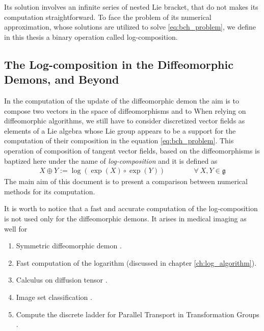 Its solution involves an infinite series of nested Lie bracket, that do not makes its computation straightforward. 
To face the problem of its numerical approximation, whose solutions are utilized to solve \ref{eq:bch_problem}, we define in this thesis a binary operation called log-composition.


\subsection{The Log-composition in the Diffeomorphic Demons, and Beyond}
In the computation of the update of the diffeomorphic demon the aim is to compose two vectors in the space of diffeomorphisms and to 
When relying on diffeomorphic algorithms, we still have to consider discretized vector fields as elements of a Lie algebra whose Lie group appears to be a support for the computation of their composition in the equation \ref{eq:bch_problem}.
This operation of composition of tangent vector fields, based on the diffeomorphisms is baptized here under the name of \emph{log-composition} and it is defined as
\begin{align*}
X \oplus Y := \log(\exp(X)\circ\exp( Y))
\qquad \qquad
\forall ~X, Y \in \mathfrak{g}
\end{align*}
The main aim of this document is to present a comparison between numerical methods for its computation. 

It is worth to notice that a fast and accurate computation of the log-composition is not used only for the diffeomorphic demons. It arises in medical imaging as well for
\begin{enumerate}
	\item Symmetric diffeomorphic demon \cite{vercauteren08}.
	\item Fast computation of the logarithm \cite{Bossa:08} (discussed in chapter \ref{ch:log_algorithm}).
	\item Calculus on diffusion tensor \cite{Arsigny:MRM:06}. 
	\item Image set classification \cite{huanglog}.
	\item Compute the discrete ladder for Parallel Transport in Transformation Groups \cite{Lorenzi:discrete_ladders:14}.
\end{enumerate}	
	
